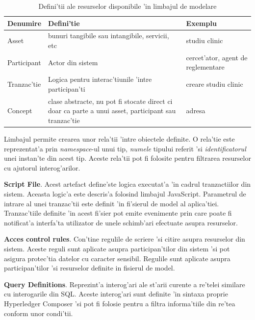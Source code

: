 \documentclass[12pt,a4paper,twoside]{report}
\begin{document}
\begin{table}[H]
\caption{Defini'tii ale resurselor disponibile 'in limbajul de modelare}
\centering
\begin{tabular}{|p{2cm}|p{5cm}|p{5cm}|}      
\hline\hline                        
Denumire & Defini'tie & Exemplu \\ [0.5ex]   %
\hline                             
Asset & bunuri tangibile sau intangibile, servicii, etc & studiu clinic\\ 
\hline  
Participant & Actor din sistem & cercet'ator, agent de reglementare\\              
\hline 
Tranzac'tie  & Logica pentru interac'tiunile 'intre participan'ti & creare studiu clinic   \\
\hline
Concept & clase abstracte, nu pot fi stocate direct ci doar ca parte a unui asset, participant sau tranzac'tie & adresa \\
[1ex]
           
\hline                              
\end{tabular}
\label{table3} 
\end{table}


Limbajul permite crearea unor rela'tii 'intre obiectele definite. O rela'tie este reprezentat'a prin \emph{namespace}-ul unui tip, \emph{numele} tipului referit 'si \emph{identificatorul} unei instan'te din acest tip. Aceste rela'tii pot fi folosite pentru filtrarea resurselor cu ajutorul interog'arilor.

\textbf{Script File}. Acest artefact define'ste logica executat'a 'in cadrul tranzactiilor din sistem. Aceasta logic'a este descris'a folosind limbajul JavaScript. Parametrul de intrare al unei tranzac'tii este definit 'in fi'sierul de model al aplica'tiei. Tranzac'tiile definite 'in acest fi'sier pot emite evenimente prin care poate fi notificat'a interfa'ta utilizator de unele schimb'ari efectuate asupra resurselor.

\textbf{Acces control rules}. Con'tine regulile de scriere 'si citire asupra resurselor din sistem. Aceste reguli sunt aplicate asupra participan'tilor din sistem 'si pot asigura protec'tia datelor cu caracter sensibil. Regulile sunt aplicate asupra participan'tilor 'si resurselor definite in fisierul de model.

\textbf{Query Definitions}. Reprezint'a interog'ari ale st'arii curente a re'telei similare cu interogarile din SQL. Aceste interog'ari sunt definite 'in sintaxa proprie Hyperledger Composer 'si pot fi folosie pentru a filtra informa'tiile din re'tea conform unor condi'tii.
\end{document}
